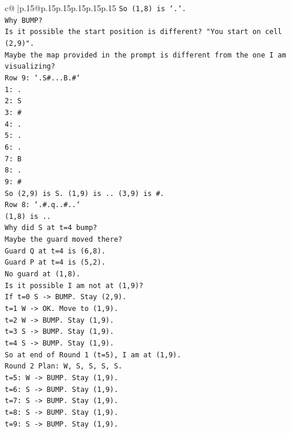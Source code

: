 \documentclass{article}
\begin{document}
{\begin{supertabular}{c@{$\;$}|p{.15\linewidth}@{}p{.15\linewidth}p{.15\linewidth}p{.15\linewidth}p{.15\linewidth}p{.15\linewidth}}
{{{\texttt{So (1,8) is `.`.} \\
\texttt{Why BUMP?} \\
\texttt{Is it possible the start position is different? "You start on cell (2,9)".} \\
\texttt{Maybe the map provided in the prompt is different from the one I am visualizing?} \\
\texttt{Row 9: `.S\#...B.\#`} \\
\texttt{1: .} \\
\texttt{2: S} \\
\texttt{3: \#} \\
\texttt{4: .} \\
\texttt{5: .} \\
\texttt{6: .} \\
\texttt{7: B} \\
\texttt{8: .} \\
\texttt{9: \#} \\
\texttt{So (2,9) is S. (1,9) is .. (3,9) is \#.} \\
\texttt{Row 8: `.\#.q..\#..`} \\
\texttt{(1,8) is ..} \\
\texttt{Why did S at t=4 bump?} \\
\texttt{Maybe the guard moved there?} \\
\texttt{Guard Q at t=4 is (6,8).} \\
\texttt{Guard P at t=4 is (5,2).} \\
\texttt{No guard at (1,8).} \\
\texttt{Is it possible I am not at (1,9)?} \\
\texttt{If t=0 S {-}> BUMP. Stay (2,9).} \\
\texttt{t=1 W {-}> OK. Move to (1,9).} \\
\texttt{t=2 W {-}> BUMP. Stay (1,9).} \\
\texttt{t=3 S {-}> BUMP. Stay (1,9).} \\
\texttt{t=4 S {-}> BUMP. Stay (1,9).} \\
\texttt{So at end of Round 1 (t=5), I am at (1,9).} \\
\texttt{Round 2 Plan: W, S, S, S, S.} \\
\texttt{t=5: W {-}> BUMP. Stay (1,9).} \\
\texttt{t=6: S {-}> BUMP. Stay (1,9).} \\
\texttt{t=7: S {-}> BUMP. Stay (1,9).} \\
\texttt{t=8: S {-}> BUMP. Stay (1,9).} \\
\texttt{t=9: S {-}> BUMP. Stay (1,9).} \\
}}}
\end{supertabular}}
\end{document}
